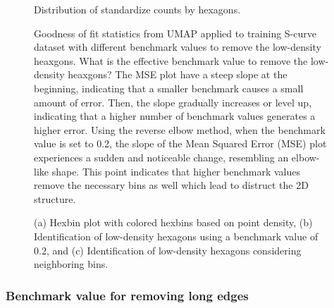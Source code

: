 \documentclass[
  12pt]{article}
\begin{document}
\begin{figure}[H]


\caption{\label{fig-stdctsScurve}Distribution of standardize counts by
hexagons.}

\end{figure}%

\begin{figure}


\caption{\label{fig-diagnosticpltScurvelwd}Goodness of fit statistics
from UMAP applied to training S-curve dataset with different benchmark
values to remove the low-density heaxgons. What is the effective
benchmark value to remove the low-density heaxgons? The MSE plot have a
steep slope at the beginning, indicating that a smaller benchmark causes
a small amount of error. Then, the slope gradually increases or level
up, indicating that a higher number of benchmark values generates a
higher error. Using the reverse elbow method, when the benchmark value
is set to 0.2, the slope of the Mean Squared Error (MSE) plot
experiences a sudden and noticeable change, resembling an elbow-like
shape. This point indicates that higher benchmark values remove the
necessary bins as well which lead to distruct the 2D structure.}

\end{figure}%

\begin{figure}[H]


\caption{\label{fig-rmlowdenshex}(a) Hexbin plot with colored hexbins
based on point density, (b) Identification of low-density hexagons using
a benchmark value of \(0.2\), and (c) Identification of low-density
hexagons considering neighboring bins.}

\end{figure}%

\subsubsection{Benchmark value for removing long
edges}\label{benchmark-value-for-removing-long-edges}
\end{document}
